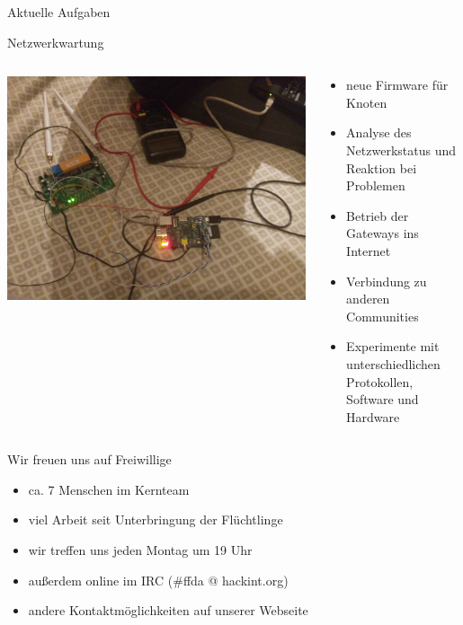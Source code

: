 \documentclass[10pt]{beamer}
\begin{document}
\begin{frame}{Aktuelle Aufgaben}
	\begin{center}
		\large Netzwerkwartung
		\vfill
	\end{center}
	\begin{columns}[T]
		\begin{column}{5cm}
			\includegraphics[width=\textwidth]{images/disassemble}
		\end{column}
		\begin{column}{7cm}
			\begin{itemize}[<+->]
				\item neue Firmware für Knoten
				\item Analyse des Netzwerkstatus und Reaktion bei Problemen
				\item Betrieb der Gateways ins Internet
				\item Verbindung zu anderen Communities
				\item Experimente mit unterschiedlichen Protokollen, Software und Hardware
			\end{itemize}
		\end{column}
	\end{columns}
\end{frame}

\begin{frame}{Wir freuen uns auf Freiwillige}
	\begin{itemize}[<+->]
		\item ca. 7 Menschen im Kernteam
		\item viel Arbeit seit Unterbringung der Flüchtlinge
		\vfill
		\item wir treffen uns jeden Montag um 19 Uhr
		\item außerdem online im IRC (\#ffda @ hackint.org)
		\item andere Kontaktmöglichkeiten auf unserer Webseite
	\end{itemize}
\end{frame}
\end{document}

